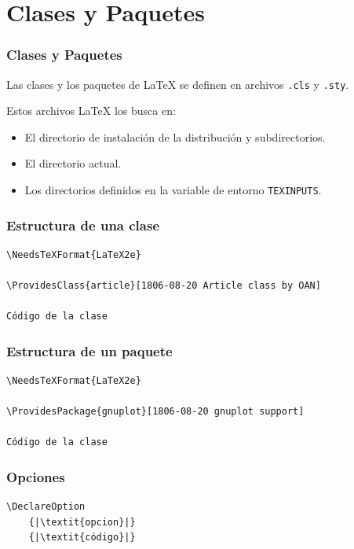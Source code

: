 \documentclass[12pt,aspectratio=169,ignorenonframetext]{ltxbeamer}
\begin{document}
\section{Clases y Paquetes}

\begin{frame}
\frametitle{Clases y Paquetes}

Las clases y los paquetes de {\lmr\LaTeX} se definen en archivos \texttt{.cls} y \texttt{.sty}.

\pause

Estos archivos {\lmr\LaTeX} los busca en:

\begin{itemize}
    \item El directorio de instalación de la distribución y subdirectorios.
    \item El directorio actual.
    \item Los directorios definidos en la variable de entorno \texttt{TEXINPUTS}.
\end{itemize}
\end{frame}





\begin{frame}[fragile]
\frametitle{Estructura de una clase}

\begin{verbatim}
\NeedsTeXFormat{LaTeX2e}

\ProvidesClass{article}[1806-08-20 Article class by OAN]

Código de la clase
\end{verbatim}
\end{frame}





\begin{frame}[fragile]
\frametitle{Estructura de un paquete}

\begin{verbatim}
\NeedsTeXFormat{LaTeX2e}

\ProvidesPackage{gnuplot}[1806-08-20 gnuplot support]

Código de la clase
\end{verbatim}
\end{frame}





\begin{frame}[fragile]
\frametitle{Opciones}

\begin{verbatim}
\DeclareOption
    {|\textit{opcion}|}
    {|\textit{código}|}
\end{verbatim}
\end{frame}
\end{document}
